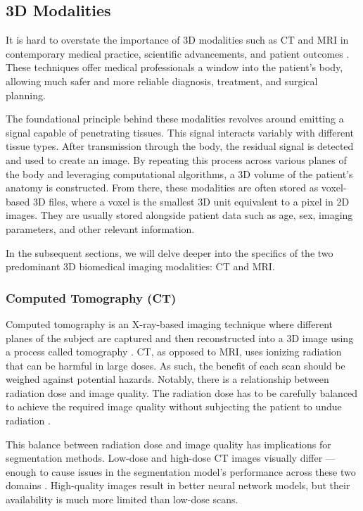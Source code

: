 \subsection{3D Modalities}

It is hard to overstate the importance of 3D modalities such as CT and MRI in contemporary medical practice, scientific advancements, and patient outcomes \cite{Wallyn2019}. These techniques offer medical professionals a window into the patient's body, allowing much safer and more reliable diagnosis, treatment, and surgical planning. 

The foundational principle behind these modalities revolves around emitting a signal capable of penetrating tissues. This signal interacts variably with different tissue types. After transmission through the body, the residual signal is detected and used to create an image. By repeating this process across various planes of the body and leveraging computational algorithms, a 3D volume of the patient's anatomy is constructed. From there, these modalities are often stored as voxel-based 3D files, where a voxel is the smallest 3D unit equivalent to a pixel in 2D images. They are usually stored alongside patient data such as age, sex, imaging parameters, and other relevant information.

In the subsequent sections, we will delve deeper into the specifics of the two predominant 3D biomedical imaging modalities: CT and MRI.

\subsubsection{Computed Tomography (CT)}

Computed tomography is an X-ray-based imaging technique where different planes of the subject are captured and then reconstructed into a 3D image using a process called tomography \cite{goldmanPrinciplesCTCT2007}. CT, as opposed to MRI, uses ionizing radiation that can be harmful in large doses. As such, the benefit of each scan should be weighed against potential hazards. Notably, there is a relationship between radiation dose and image quality. The radiation dose has to be carefully balanced to achieve the required image quality without subjecting the patient to undue radiation \cite{goldmanPrinciplesCTRadiation2007}.

This balance between radiation dose and image quality has implications for segmentation methods. Low-dose and high-dose CT images visually differ --- enough to cause issues in the segmentation model's performance across these two domains \cite{liLowDoseCTImage2023}. High-quality images result in better neural network models, but their availability is much more limited than low-dose scans.

